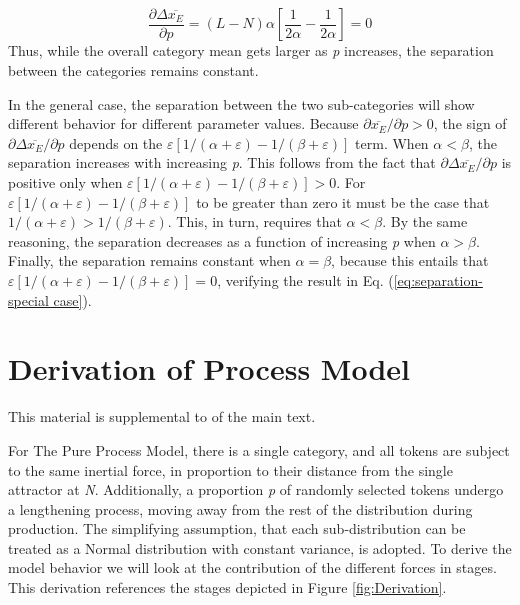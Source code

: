 \begin{equation}
\frac{\partial\Delta\overline{x_{E}}}{\partial p}=(L-N)\alpha\left[\frac{1}{2\alpha}-\frac{1}{2\alpha}\right]=0\label{eq:separation-special case}
\end{equation}
Thus, while the overall category mean gets larger as \emph{p} increases,
the separation between the categories remains constant. 

In the general case, the separation between the two sub-categories
will show different behavior for different parameter values. Because
${\partial\overline{x_{E}}}/{\partial p}>0$, the sign of ${\partial\Delta\overline{x_{E}}}/{\partial p}$
depends on the $\varepsilon[{1}/({\alpha+\varepsilon})-{1}/({\beta+\varepsilon})]$
term. When $\alpha<\beta$, the separation increases with increasing
\emph{p}. This follows from the fact that ${\partial\Delta\overline{x_{E}}}/{\partial p}$
is positive only when $\varepsilon[{1}/({\alpha+\varepsilon})-{1}/({\beta+\varepsilon})]>0$.
For $\varepsilon[{1}/({\alpha+\varepsilon})-{1}/({\beta+\varepsilon})]$
to be greater than zero it must be the case that ${1}/({\alpha+\varepsilon})>{1}/({\beta+\varepsilon})$.
This, in turn, requires that $\alpha<\beta$. By the same reasoning,
the separation decreases as a function of increasing \emph{p} when
$\alpha>\beta$. Finally, the separation remains constant when $\alpha=\beta$,
because this entails that $\varepsilon[{1}/({\alpha+\varepsilon})-{1}/({\beta+\varepsilon})]=0$,
verifying the result in Eq. (\ref{eq:separation-special case}).

\chapter{\label{chap:Appendix D}Derivation of Process Model}

This material is supplemental to 
of the main text.

For The Pure Process Model, there is a single category, and all tokens
are subject to the same inertial force, in proportion to their distance
from the single attractor at \emph{N}. Additionally, a proportion
\emph{p} of randomly selected tokens undergo a lengthening process,
moving away from the rest of the distribution during production. The
simplifying assumption, that each sub-distribution can be treated
as a Normal distribution with constant variance, is adopted. To derive
the model behavior we will look at the contribution of the different
forces in stages. This derivation references the stages depicted in
Figure \ref{fig:Derivation}.

